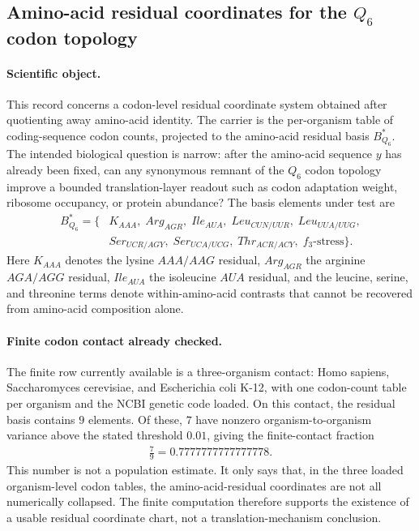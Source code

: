 \subsection{Amino-acid residual coordinates for the $Q_6$ codon topology}
\label{sec:bior-reality-residual-basis-q6-translation-realization}

\paragraph{Scientific object.}
This record concerns a codon-level residual coordinate system obtained after quotienting away amino-acid identity.  The carrier is the per-organism table of coding-sequence codon counts, projected to the amino-acid residual basis $B^*_{Q_6}$.  The intended biological question is narrow: after the amino-acid sequence $y$ has already been fixed, can any synonymous remnant of the $Q_6$ codon topology improve a bounded translation-layer readout such as codon adaptation weight, ribosome occupancy, or protein abundance?  The basis elements under test are
$$
\begin{aligned}
B^*_{Q_6}=\{&K_{AAA},\; Arg_{AGR},\; Ile_{AUA},\; Leu_{CUN/UUR},\; Leu_{UUA/UUG},\\
&Ser_{UCR/AGY},\; Ser_{UCA/UCG},\; Thr_{ACR/ACY},\; f_3\text{-stress}\}.
\end{aligned}
$$
Here $K_{AAA}$ denotes the lysine $AAA/AAG$ residual, $Arg_{AGR}$ the arginine $AGA/AGG$ residual, $Ile_{AUA}$ the isoleucine $AUA$ residual, and the leucine, serine, and threonine terms denote within-amino-acid contrasts that cannot be recovered from amino-acid composition alone.

\paragraph{Finite codon contact already checked.}
The finite row currently available is a three-organism contact: Homo sapiens, Saccharomyces cerevisiae, and Escherichia coli K-12, with one codon-count table per organism and the NCBI genetic code loaded.  On this contact, the residual basis contains $9$ elements.  Of these, $7$ have nonzero organism-to-organism variance above the stated threshold $0.01$, giving the finite-contact fraction
$$
\begin{aligned}
\frac{7}{9}=0.7777777777777778.
\end{aligned}
$$
This number is not a population estimate.  It only says that, in the three loaded organism-level codon tables, the amino-acid-residual coordinates are not all numerically collapsed.  The finite computation therefore supports the existence of a usable residual coordinate chart, not a translation-mechanism conclusion.


